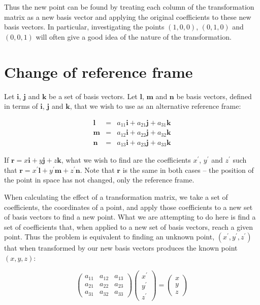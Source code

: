 \documentclass[a5paper]{article}
\begin{document}
Thus the new point can be found by treating each column of the transformation
matrix as a new basis vector and applying the original coefficients to these new
basis vectors. In particular, investigating the points $(1,0,0)$, $(0,1,0)$ and
$(0,0,1)$ will often give a good idea of the nature of the transformation.

\section*{Change of reference frame}

Let $\bm{i}$, $\bm{j}$ and $\bm{k}$ be a set of basis vectors. Let $\bm{l}$,
$\bm{m}$ and $\bm{n}$ be basis vectors, defined in terms of $\bm{i}$, $\bm{j}$
and $\bm{k}$, that we wish to use as an alternative reference frame:

\begin{eqnarray*}
    \bm{l} & = & a_{11}\bm{i} + a_{21}\bm{j} + a_{31}\bm{k} \\
    \bm{m} & = & a_{12}\bm{i} + a_{22}\bm{j} + a_{32}\bm{k} \\
    \bm{n} & = & a_{13}\bm{i} + a_{23}\bm{j} + a_{33}\bm{k}
\end{eqnarray*}

If $\bm{r} = x\bm{i} + y\bm{j} + z\bm{k}$, what we wish to find are the
coefficients $x^\prime$, $y^\prime$ and $z^\prime$ such that $\bm{r} =
x^\prime\bm{l} + y^\prime\bm{m} + z^\prime\bm{n}$. Note that $\bm{r}$ is the
same in both cases -- the position of the point in space has not changed, only
the reference frame.

When calculating the effect of a transformation matrix, we take a set of
coefficients, the coordinates of a point, and apply those coefficients to a new
set of basis vectors to find a new point. What we are attempting to do here is
find a set of coefficients that, when applied to a new set of basis vectors,
reach a given point. Thus the problem is equivalent to finding an unknown point,
$(x^\prime, y^\prime, z^\prime)$ that when transformed by our new basis vectors
produces the known point $(x, y, z)$:

\begin{equation}
  \left(
  \begin{array}{ccc}
    a_{11} & a_{12} &a_{13} \\
    a_{21} & a_{22} &a_{23} \\
    a_{31} & a_{32} &a_{33}
  \end{array} \right)
  \left(
  \begin{array}{c}
    x^\prime\\ y^\prime\\ z^\prime
  \end{array} \right) =
  \left(
  \begin{array}{c}
    x\\ y\\ z
  \end{array} \right)
\end{equation}
\end{document}

